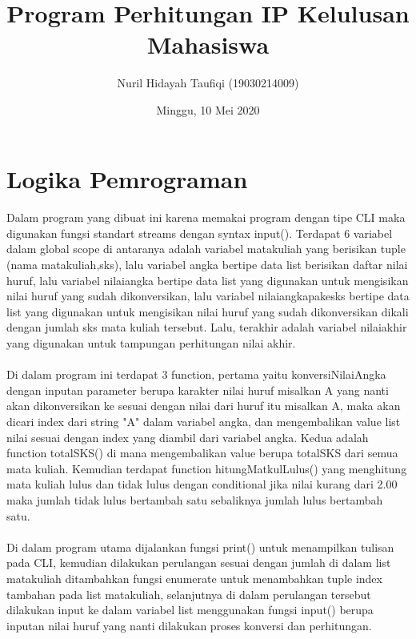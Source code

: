 \documentclass[a4paper]{article}
\title{Program Perhitungan IP Kelulusan Mahasiswa}
\author{Nuril Hidayah Taufiqi (19030214009) }
\date{Minggu, 10 Mei 2020}
\begin{document}
\maketitle

\section{Logika Pemrograman}

\paragraph{}
Dalam program yang dibuat ini karena memakai program dengan tipe CLI maka digunakan fungsi standart streams dengan syntax input(). Terdapat 6 variabel dalam global scope di antaranya adalah variabel matakuliah yang berisikan tuple (nama matakuliah,sks), lalu variabel angka bertipe data list berisikan daftar nilai huruf, lalu variabel nilaiangka bertipe data list yang digunakan untuk mengisikan nilai huruf yang sudah dikonversikan, lalu variabel nilaiangkapakesks bertipe data list yang digunakan untuk mengisikan nilai huruf yang sudah dikonversikan dikali dengan jumlah sks mata kuliah tersebut. Lalu, terakhir adalah variabel nilaiakhir yang digunakan untuk tampungan perhitungan nilai akhir. 
\paragraph{}
Di dalam program ini terdapat 3 function, pertama yaitu konversiNilaiAngka dengan inputan parameter berupa karakter nilai huruf misalkan A yang nanti akan dikonversikan ke sesuai dengan nilai dari huruf itu misalkan A, maka akan dicari index dari string "A" dalam variabel angka, dan mengembalikan value list nilai sesuai dengan index yang diambil dari variabel angka. Kedua adalah function totalSKS() di mana mengembalikan value berupa totalSKS dari semua mata kuliah. Kemudian terdapat function hitungMatkulLulus() yang menghitung mata kuliah lulus dan tidak lulus dengan conditional jika nilai kurang dari 2.00 maka jumlah tidak lulus bertambah satu sebaliknya jumlah lulus bertambah satu.
\paragraph{}
Di dalam program utama dijalankan fungsi print() untuk menampilkan tulisan pada CLI, kemudian dilakukan perulangan sesuai dengan jumlah di dalam list matakuliah ditambahkan fungsi enumerate untuk menambahkan tuple index tambahan pada list matakuliah, selanjutnya di dalam perulangan tersebut dilakukan input ke dalam variabel list menggunakan fungsi input() berupa inputan nilai huruf yang nanti dilakukan proses konversi dan perhitungan.
\end{document}
